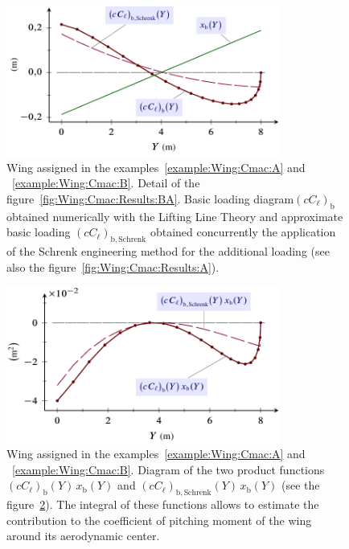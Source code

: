 \documentclass[[12pt,twoside]{book}
\begin{document}
\begin{figure}[t]%
    \includegraphics[width=0.80\textwidth]{Chapter_2/pitching_moment_two/wing_Cmac_2_loading_drawing_2.pdf}%
  \caption{
           Wing assigned in the examples~\ref{example:Wing:Cmac:A} and ~\ref{example:Wing:Cmac:B}.
           Detail of the figure~\ref{fig:Wing:Cmac:Results:BA}.
           Basic loading diagram$(cC_\ell)_\mathrm{b}$ obtained numerically
            with the Lifting Line Theory
         and approximate basic loading $(cC_\ell)_\mathrm{b,Schrenk}$ obtained concurrently
            the application of the Schrenk engineering method for the additional loading
           (see also the figure~\ref{fig:Wing:Cmac:Results:A}).}
  \label{fig:Wing:Cmac:Results:BB}%
\end{figure}
\begin{figure}
  [t]%
    \includegraphics[width=0.80\textwidth]{Chapter_2/pitching_moment_two/wing_Cmac_2_loading_drawing_3.pdf}%
  \caption{
         Wing assigned in the examples~\ref{example:Wing:Cmac:A} and ~\ref{example:Wing:Cmac:B}.
          Diagram of the two product functions $(cC_\ell)_\mathrm{b}(Y)\,x_\mathrm{b}(Y)$ 
          and $(cC_\ell)_\mathrm{b,Schrenk}(Y)\,x_\mathrm{b}(Y)$
           (see the    figure~\ref{fig:Wing:Cmac:Results:BC}).
           The integral of these functions allows to estimate the contribution
            to the coefficient
            of pitching moment 
      of the wing around its aerodynamic center.
  }
  \label{fig:Wing:Cmac:Results:BC}%
\end{figure}%
\end{document}
